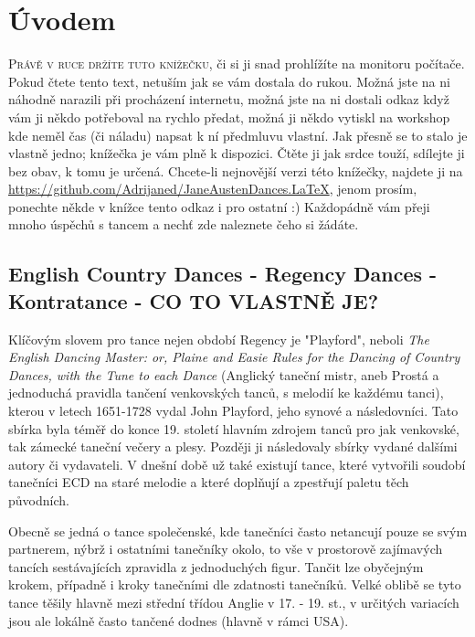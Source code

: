 \chapter{Úvodem}

\lettrine{P}{rávě v ruce držíte tuto knížečku}, či si ji snad prohlížíte na monitoru počítače. Pokud čtete tento text, netuším jak se vám dostala do rukou. Možná jste na ni náhodně narazili při procházení internetu, možná jste na ni dostali odkaz když vám ji někdo potřeboval na rychlo předat, možná ji někdo vytiskl na workshop kde neměl čas (či náladu) napsat k ní předmluvu vlastní. Jak přesně se to stalo je vlastně jedno; knížečka je vám plně k dispozici. Čtěte ji jak srdce touží, sdílejte ji bez obav, k tomu je určená. Chcete-li nejnovější verzi této knížečky, najdete ji na \url{https://github.com/Adrijaned/JaneAustenDances.LaTeX}, jenom prosím, ponechte někde v knížce tento odkaz i pro ostatní :) Každopádně vám přeji mnoho úspěchů s tancem a nechť zde naleznete čeho si žádáte.

\section*{English Country Dances - Regency Dances - Kontratance - CO TO VLASTNĚ JE?}

Klíčovým slovem pro tance nejen období Regency je "Playford", neboli \textit{The English Dancing Master: or, Plaine and Easie Rules for the Dancing of Country Dances, with the Tune to each Dance} (Anglický taneční mistr, aneb Prostá a jednoduchá pravidla tančení venkovských tanců, s melodií ke každému tanci), kterou v letech 1651-1728 vydal John Playford, jeho synové a následovníci. Tato sbírka byla téměř do konce 19. století hlavním zdrojem tanců pro jak venkovské, tak zámecké taneční večery a plesy. Později ji následovaly sbírky vydané dalšími autory či vydavateli. V dnešní době už také existují tance, které vytvořili soudobí tanečníci ECD na staré melodie a které doplňují a  zpestřují paletu těch původních.

Obecně se jedná o tance společenské, kde tanečníci často netancují pouze se svým partnerem, nýbrž i ostatními tanečníky okolo, to vše v prostorově zajímavých tancích sestávajících zpravidla z jednoduchých figur. Tančit lze obyčejným krokem, případně i kroky tanečními dle zdatnosti tanečníků. Velké oblibě se tyto tance těšily hlavně mezi střední třídou Anglie v 17. - 19. st., v určitých variacích jsou ale lokálně často tančené dodnes (hlavně v rámci USA).

